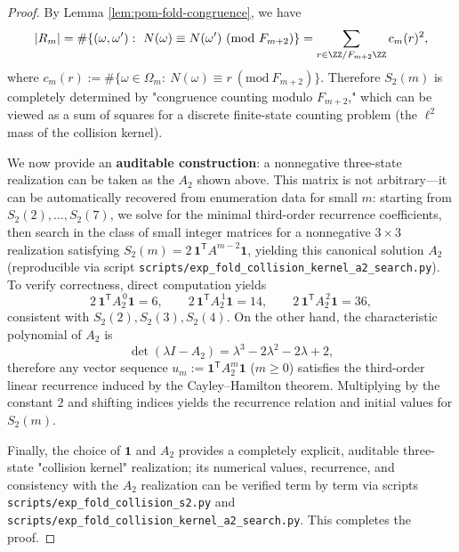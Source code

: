 \begin{proof}
By Lemma \ref{lem:pom-fold-congruence}, we have
$$
|R_m|
=\#\{(\omega,\omega'):\ N(\omega)\equiv N(\omega')\ (\mathrm{mod}\ F_{m+2})\}
=\sum_{r\in\ZZ/F_{m+2}\ZZ} c_m(r)^2,
$$
where \(c_m(r):=\#\{\omega\in\Omega_m:\ N(\omega)\equiv r\ (\mathrm{mod}\ F_{m+2})\}\).
Therefore \(S_2(m)\) is completely determined by "congruence counting modulo \(F_{m+2}\)," which can be viewed as a sum of squares for a discrete finite-state counting problem (the \(\ell^2\) mass of the collision kernel).

We now provide an\textbf{ auditable construction}: a nonnegative three-state realization can be taken as the \(A_2\) shown above. This matrix is not arbitrary—it can be automatically recovered from enumeration data for small \(m\): starting from \(S_2(2),\dots,S_2(7)\), we solve for the minimal third-order recurrence coefficients, then search in the class of small integer matrices for a nonnegative \(3\times 3\) realization satisfying
\(
S_2(m)=2\,\mathbf{1}^{\mathsf T}A^{m-2}\mathbf{1}
\),
yielding this canonical solution \(A_2\) (reproducible via script \texttt{scripts/exp\_fold\_collision\_kernel\_a2\_search.py}).
To verify correctness, direct computation yields
$$
2\,\mathbf{1}^{\mathsf T}A_2^{\,0}\mathbf{1}=6,\qquad
2\,\mathbf{1}^{\mathsf T}A_2^{\,1}\mathbf{1}=14,\qquad
2\,\mathbf{1}^{\mathsf T}A_2^{\,2}\mathbf{1}=36,
$$
consistent with \(S_2(2),S_2(3),S_2(4)\). On the other hand, the characteristic polynomial of \(A_2\) is
$$
\det(\lambda I-A_2)=\lambda^3-2\lambda^2-2\lambda+2,
$$
therefore any vector sequence \(u_m:=\mathbf{1}^{\mathsf T}A_2^{m}\mathbf{1}\) (\(m\ge 0\)) satisfies the third-order linear recurrence induced by the Cayley--Hamilton theorem. Multiplying by the constant \(2\) and shifting indices yields the recurrence relation and initial values for \(S_2(m)\).

Finally, the choice of \(\mathbf{1}\) and \(A_2\) provides a completely explicit, auditable three-state "collision kernel" realization; its numerical values, recurrence, and consistency with the \(A_2\) realization can be verified term by term via scripts \texttt{scripts/exp\_fold\_collision\_s2.py} and \texttt{scripts/exp\_fold\_collision\_kernel\_a2\_search.py}. This completes the proof.
\end{proof}

